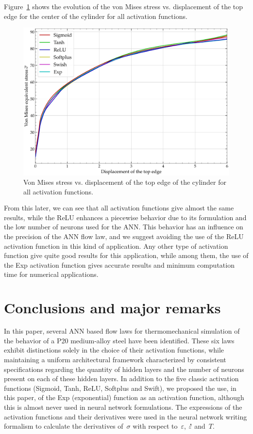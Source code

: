 \documentclass[algorithms,article,submit,pdftex,oneauthors]{Definitions/mdpi}
\DeclareRobustCommand{\mdot}[1]{\accentset{\mbox{\bfseries .}}{#1}}
\begin{document}
Figure~\ref{fig:Num-misesTH} shows the evolution of the von Mises stress vs. displacement of the top edge for the center of the cylinder for all activation functions.
\begin{figure}[h!]
\centering
\includegraphics[width=0.7\columnwidth]{Figures/vonMises}
\caption{Von Mises stress vs. displacement of the top edge of the cylinder for all activation functions.}
\label{fig:Num-misesTH}
\end{figure}
From this later, we can see that all activation functions give almost the same results, while the ReLU enhances a piecewise behavior due to its formulation and the low number of neurons used for the ANN.
This behavior has an influence on the precision of the ANN flow law, and we suggest avoiding the use of the ReLU activation function in this kind of application.
Any other type of activation function give quite good results for this application, while among them, the use of the Exp activation function gives accurate results and minimum computation time for numerical applications.

\section{Conclusions and major remarks}\label{sec:Conclusions}

In this paper, several ANN based flow laws for thermomechanical simulation of the behavior of a P20 medium-alloy steel have been identified.
These six laws exhibit distinctions solely in the choice of their activation functions, while maintaining a uniform architectural framework characterized by consistent specifications regarding the quantity of hidden layers and the number of neurons present on each of these hidden layers.
In addition to the five classic activation functions (Sigmoid, Tanh, ReLU, Softplus and Swift), we proposed the use, in this paper, of the Exp (exponential) function as an activation function, although this is almost never used in neural network formulations.
The expressions of the activation functions and their derivatives were used in the neural network writing formalism to calculate the derivatives of~$\sigma$ with respect to~$\varepsilon$, $\mdot{\varepsilon}$ and~$T$.
\end{document}
